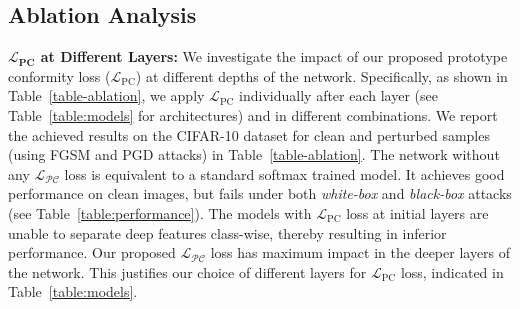 \documentclass[10pt,twocolumn,letterpaper]{article}
\begin{document}
\subsection{Ablation Analysis}
\label{subsec:ablation}
\vspace{-0.25em}
\noindent \textbf{$\mathbf{\mathcal{L}_\text{PC}}$ at Different Layers:} We investigate the impact of our proposed prototype conformity loss ($\mathcal{L}_\text{PC}$) at different depths of the network. Specifically, as shown in Table~\ref{table-ablation}, we apply $\mathcal{L}_\text{PC}$ individually after each layer (see Table~\ref{table:models} for architectures) and in different combinations. We report the achieved results on the CIFAR-10 dataset for clean and perturbed samples (using FGSM and PGD attacks) in Table~\ref{table-ablation}. The network without any $\mathcal{L_\text{PC}}$ loss is equivalent to a standard softmax trained model. It achieves good performance on clean images, but fails under both \textit{white-box} and \textit{black-box} attacks (see Table~\ref{table:performance}). The models with $\mathcal{L}_\text{PC}$ loss at initial layers are unable to separate deep features class-wise, thereby resulting in inferior performance. Our proposed $\mathcal{L_\text{PC}}$ loss has maximum impact in the deeper layers of the network. This justifies our choice of different layers for $\mathcal{L}_\text{PC}$ loss, indicated in  Table~\ref{table:models}.
\end{document}
